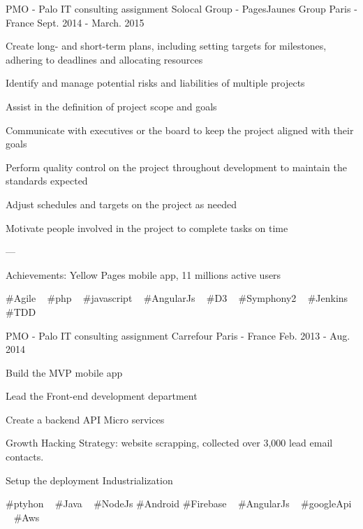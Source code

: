 \begin{cventries}
  \cventry
    {PMO - Palo IT consulting assignment} %
    {Solocal Group - PagesJaunes Group} %
    {Paris - France} %
    {Sept. 2014 - March. 2015} %
    {
      \begin{cvitems} %
        \item {Create long- and short-term plans, including setting targets for milestones, adhering to deadlines and allocating resources}
        \item {Identify and manage potential risks and liabilities of multiple projects}
        \item {Assist in the definition of project scope and goals}
        \item {Communicate with executives or the board to keep the project aligned with their goals}
        \item {Perform quality control on the project throughout development to maintain the standards expected}
        \item {Adjust schedules and targets on the project as needed}
        \item {Motivate people involved in the project to complete tasks on time}
        \item {---}
        \item {Achievements: Yellow Pages mobile app, 11 millions active users}
      \end{cvitems}
    }
    {
      \#Agile ~
      \#php ~
      \#javascript ~
      \#AngularJs ~
      \#D3 ~
      \#Symphony2 ~
      \#Jenkins ~
      \#TDD
    }

  \cventry
    {PMO - Palo IT consulting assignment} %
    {Carrefour} %
    {Paris - France} %
    {Feb. 2013 - Aug. 2014} %
    {
      \begin{cvitems} %
        \item {Build the MVP mobile app}
        \item {Lead the Front-end development department}
        \item {Create a backend API Micro services}
        \item {Growth Hacking Strategy: website scrapping, collected over 3,000 lead email contacts.}
        \item {Setup the deployment Industrialization}
      \end{cvitems}
    }
    {
      \#ptyhon ~
      \#Java ~
      \#NodeJs
      \#Android
      \#Firebase ~
      \#AngularJs ~
      \#googleApi ~
      \#Aws ~
    }


\end{cventries}

